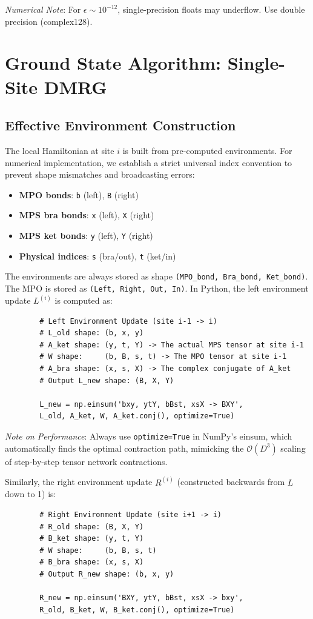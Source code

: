 \documentclass[aps,prb,onecolumn,scriptaddress]{revtex4-2}
\newcommand{\eps}{\epsilon}
\newcommand{\Order}{\mathcal{O}}
\begin{document}
	\textit{Numerical Note}: For $\eps \sim 10^{-12}$, single-precision floats may underflow. Use double precision (complex128).
	
	\section{Ground State Algorithm: Single-Site DMRG}
	
	\subsection{Effective Environment Construction}
	The local Hamiltonian at site $i$ is built from pre-computed environments.
	For numerical implementation, we establish a strict universal index convention to prevent shape mismatches and broadcasting errors:
	\begin{itemize}
		\item \textbf{MPO bonds}: \texttt{b} (left), \texttt{B} (right)
		\item \textbf{MPS bra bonds}: \texttt{x} (left), \texttt{X} (right)
		\item \textbf{MPS ket bonds}: \texttt{y} (left), \texttt{Y} (right)
		\item \textbf{Physical indices}: \texttt{s} (bra/out), \texttt{t} (ket/in)
	\end{itemize}
	
	The environments are always stored as shape \texttt{(MPO\_bond, Bra\_bond, Ket\_bond)}. The MPO is stored as \texttt{(Left, Right, Out, In)}. In Python, the left environment update $L^{(i)}$ is computed as:
	\begin{verbatim}
		# Left Environment Update (site i-1 -> i)
		# L_old shape: (b, x, y)
		# A_ket shape: (y, t, Y) -> The actual MPS tensor at site i-1
		# W shape:     (b, B, s, t) -> The MPO tensor at site i-1
		# A_bra shape: (x, s, X) -> The complex conjugate of A_ket
		# Output L_new shape: (B, X, Y)
		
		L_new = np.einsum('bxy, ytY, bBst, xsX -> BXY', 
		L_old, A_ket, W, A_ket.conj(), optimize=True)
	\end{verbatim}
	\textit{Note on Performance}: Always use \texttt{optimize=True} in NumPy's einsum, which automatically finds the optimal contraction path, mimicking the $\Order(D^3)$ scaling of step-by-step tensor network contractions.
	
	Similarly, the right environment update $R^{(i)}$ (constructed backwards from $L$ down to 1) is:
	\begin{verbatim}
		# Right Environment Update (site i+1 -> i)
		# R_old shape: (B, X, Y)
		# B_ket shape: (y, t, Y)
		# W shape:     (b, B, s, t)
		# B_bra shape: (x, s, X)
		# Output R_new shape: (b, x, y)
		
		R_new = np.einsum('BXY, ytY, bBst, xsX -> bxy', 
		R_old, B_ket, W, B_ket.conj(), optimize=True)
	\end{verbatim}
	
\end{document}
